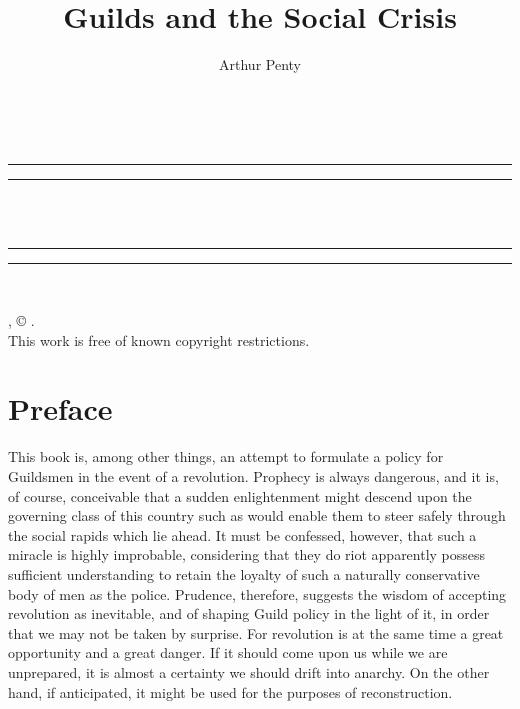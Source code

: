 \documentclass{book}
\date{}
\title{Guilds and the Social Crisis}
\author{Arthur Penty}
\begin{document}
\thispagestyle{empty}
\begin{center}
	{\Huge \@title   \\[5mm]}
\end{center}
\newpage
\thispagestyle{empty}
\cleardoublepage
\begin{center}
	\thispagestyle{empty}
	\vspace*{\baselineskip}
	\rule{\textwidth}{1.6pt}\vspace*{-\baselineskip}\vspace*{2pt}
	\rule{\textwidth}{0.4pt}\\[\baselineskip]
	{\Huge\scshape \@title   \\[5mm]}
	{\Large }
	\rule{\textwidth}{0.4pt}\vspace*{-\baselineskip}\vspace{3.2pt}
	\rule{\textwidth}{1.6pt}\\[\baselineskip]
	\vspace*{4\baselineskip}
	{\Large \@author}
	\vfill
\end{center}
\pagebreak
\newpage
\thispagestyle{empty}
\null\vfill
\noindent
\begin{center}
	{\emph{\@title}, © \@author.\\[5mm]}
	{This work is free of known copyright restrictions.\\[5mm]}
\end{center}
\pagebreak
\newpage
\setcounter{tocdepth}{0}
\setcounter{secnumdepth}{0}

\chapter*{Preface}
\label{chapter-0}
This book is, among other things, an attempt to formulate a policy for Guildsmen in the event of a revolution. Prophecy is always dangerous, and it is, of course, conceivable that a sudden enlightenment might descend upon the governing class of this country such as would enable them to steer safely through the social rapids which lie ahead. It must be confessed, however, that such a miracle is highly improbable, considering that they do riot apparently possess sufficient understanding to retain the loyalty of such a naturally conservative body of men as the police. Prudence, therefore, suggests the wisdom of accepting revolution as inevitable, and of shaping Guild policy in the light of it, in order that we may not be taken by surprise. For revolution is at the same time a great opportunity and a great danger. If it should come upon us while we are unprepared, it is almost a certainty we should drift into anarchy. On the other hand, if anticipated, it might be used for the purposes of reconstruction.
\end{document}
